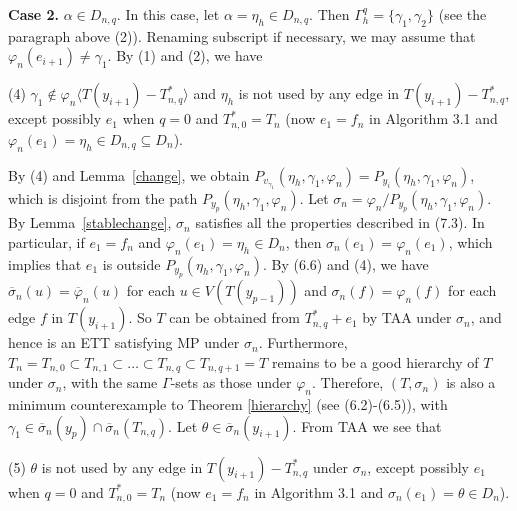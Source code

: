 \documentclass[11pt]{article}
\newcommand{\phibar}{\overline{\varphi}}
\begin{document}
{\bf Case 2.} $\alpha\in D_{n,q}$. In this case, let $\alpha=\eta_h\in D_{n,q}$. Then $\Gamma^{q}_h=\{\gamma_{1},
\gamma_{2}\}$ (see the paragraph above (2)). Renaming subscript if necessary, we may assume that $\varphi_n(e_{i+1}) 
\neq \gamma_{1}$. By (1) and (2), we have

(4) $\gamma_{1}\notin \varphi_n \langle T(y_{i+1})-T_{n,q}^* \rangle$ and $\eta_h$ is not used by any edge in 
$T(y_{i+1}) -  T_{n,q}^*$, except possibly $e_1$ when $q=0$ and $T_{n,0}^*=T_n$ (now $e_1=f_n$ in Algorithm 3.1 
and $\varphi_n(e_1)=\eta_h \in D_{n,q} \subseteq D_n$).

By (4) and Lemma~\ref{change}, we obtain $P_{v_{\gamma_1}}(\eta_h,\gamma_{1},\varphi_n)=P_{y_i}(\eta_h,\gamma_{1}, \varphi_n)$,
which is disjoint from the path $P_{y_p}(\eta_h,\gamma_{1},\varphi_n)$. Let $\sigma_n=\varphi_n/P_{y_p}(\eta_h,\gamma_{1},
\varphi_n)$. By Lemma~\ref{stablechange}, $\sigma_n$ satisfies all the properties described in (7.3). 
In particular, if $e_1=f_n$ and $\varphi_n(e_1)=\eta_h \in D_n$, then $\sigma_n(e_1)=\varphi_n(e_1)$, which implies that 
$e_1$ is outside $P_{y_p}(\eta_h,\gamma_{1}, \varphi_n)$. By  (6.6) and 
(4), we have $\overline{\sigma}_n(u)=\phibar_n(u)$ for each $u \in V(T(y_{p-1}))$ and $\sigma_n(f)=\varphi_n(f)$ for
each edge $f$ in $T(y_{i+1})$. So $T$ can be obtained from $T_{n,q}^*+e_1$ by TAA under $\sigma_n$, and hence is an ETT 
satisfying MP under $\sigma_n$. Furthermore, $T_n=T_{n,0} \subset T_{n,1} \subset \ldots \subset T_{n,q}\subset T_{n,q+1}=T$ 
remains to be a good hierarchy of $T$ under $\sigma_n$, with the same $\Gamma$-sets as those under $\varphi_n$. Therefore,
$(T, \sigma_n)$ is also a minimum counterexample to Theorem \ref{hierarchy} (see (6.2)-(6.5)), with $\gamma_{1}\in \overline{\sigma}_n(y_p) \cap \overline{\sigma}_n(T_{n,q})$.  Let $\theta\in\overline{\sigma}_n(y_{i+1})$. From TAA
we see that 

(5) $\theta$ is not used by any edge in $T(y_{i+1}) -  T_{n,q}^*$ under $\sigma_n$, except possibly $e_1$ when $q=0$ and $T_{n,0}^*=T_n$ (now $e_1=f_n$ in Algorithm 3.1 and $\sigma_n(e_1)=\theta \in D_n$).
\end{document}
